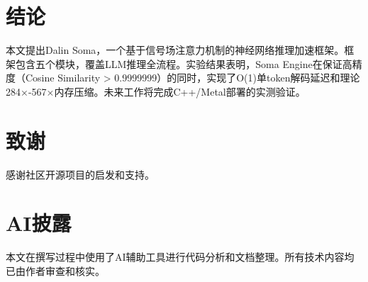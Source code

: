 \documentclass[12pt, a4paper]{article}
\begin{document}
\newpage

\section{结论}

本文提出Dalin Soma，一个基于信号场注意力机制的神经网络推理加速框架。框架包含五个模块，覆盖LLM推理全流程。实验结果表明，Soma Engine在保证高精度（Cosine Similarity > 0.9999999）的同时，实现了O(1)单token解码延迟和理论284×-567×内存压缩。未来工作将完成C++/Metal部署的实测验证。

\section*{致谢}

感谢社区开源项目的启发和支持。

\section*{AI披露}

本文在撰写过程中使用了AI辅助工具进行代码分析和文档整理。所有技术内容均已由作者审查和核实。



\end{document}
